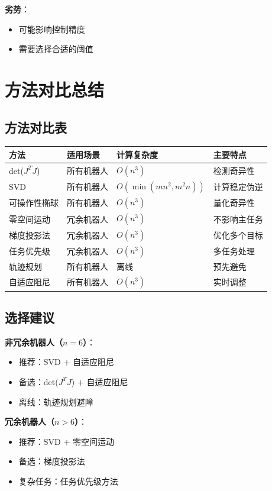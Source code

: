 \documentclass[12pt,a4paper]{article}
\begin{document}
\textbf{劣势}：
\begin{itemize}
\item 可能影响控制精度
\item 需要选择合适的阈值
\end{itemize}

\section{方法对比总结}

\subsection{方法对比表}

\begin{center}
\begin{tabular}{|l|l|l|l|}
\hline
\textbf{方法} & \textbf{适用场景} & \textbf{计算复杂度} & \textbf{主要特点} \\
\hline
det($J^T J$) & 所有机器人 & $O(n^3)$ & 检测奇异性 \\
\hline
SVD & 所有机器人 & $O(\min(mn^2, m^2n))$ & 计算稳定伪逆 \\
\hline
可操作性椭球 & 所有机器人 & $O(n^3)$ & 量化奇异性 \\
\hline
零空间运动 & 冗余机器人 & $O(n^3)$ & 不影响主任务 \\
\hline
梯度投影法 & 冗余机器人 & $O(n^3)$ & 优化多个目标 \\
\hline
任务优先级 & 冗余机器人 & $O(n^3)$ & 多任务处理 \\
\hline
轨迹规划 & 所有机器人 & 离线 & 预先避免 \\
\hline
自适应阻尼 & 所有机器人 & $O(n^3)$ & 实时调整 \\
\hline
\end{tabular}
\end{center}

\subsection{选择建议}

\textbf{非冗余机器人（$n = 6$）}：
\begin{itemize}
\item 推荐：SVD + 自适应阻尼
\item 备选：det($J^T J$) + 自适应阻尼
\item 离线：轨迹规划避障
\end{itemize}

\textbf{冗余机器人（$n > 6$）}：
\begin{itemize}
\item 推荐：SVD + 零空间运动
\item 备选：梯度投影法
\item 复杂任务：任务优先级方法
\end{itemize}
\end{document}
